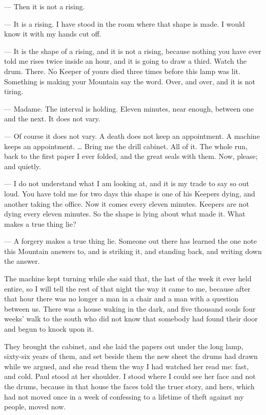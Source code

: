 
\begin{room}

--- Then it is not a rising.

--- It is a rising. I have stood in the room where that shape is made. I would know it with my hands cut off.

--- It is the shape of a rising, and it is not a rising, because nothing you have ever told me rises twice inside an hour, and it is going to draw a third. Watch the drum. There. No Keeper of yours died three times before this lamp was lit. Something is making your Mountain say the word. Over, and over, and it is not tiring.

--- Madame. The interval is holding. Eleven minutes, near enough, between one and the next. It does not vary.

--- Of course it does not vary. A death does not keep an appointment. A machine keeps an appointment. \ldots{} Bring me the drill cabinet. All of it. The whole run, back to the first paper I ever folded, and the great seals with them. Now, please; and quietly.

--- I do not understand what I am looking at, and it is my trade to say so out loud. You have told me for two days this shape is one of his Keepers dying, and another taking the office. Now it comes every eleven minutes. Keepers are not dying every eleven minutes. So the shape is lying about what made it. What makes a true thing lie?

--- A forgery makes a true thing lie. Someone out there has learned the one note this Mountain answers to, and is striking it, and standing back, and writing down the answer.

\end{room}

The machine kept turning while she said that, the last of the week it ever held entire, so I will tell the rest of that night the way it came to me, because after that hour there was no longer a man in a chair and a man with a question between us. There was a house waking in the dark, and five thousand souls four weeks' walk to the south who did not know that somebody had found their door and begun to knock upon it.\par

They brought the cabinet, and she laid the papers out under the long lamp, sixty-six years of them, and set beside them the new sheet the drums had drawn while we argued, and she read them the way I had watched her read me: fast, and cold. Paul stood at her shoulder. I stood where I could see her face and not the drums, because in that house the faces told the truer story, and hers, which had not moved once in a week of confessing to a lifetime of theft against my people, moved now.\par

